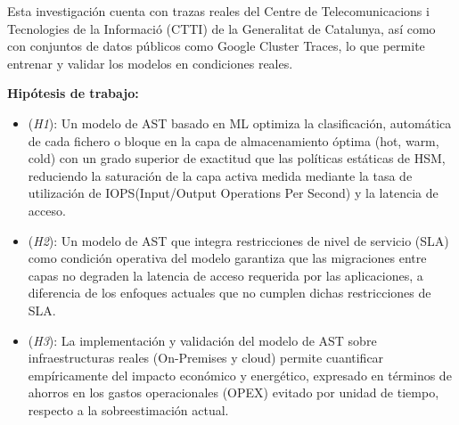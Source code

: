 Esta investigación cuenta con trazas reales del Centre de Telecomunicacions i Tecnologies de la Informació (CTTI) de la Generalitat de Catalunya, así como con conjuntos de datos públicos como Google Cluster Traces, lo que permite entrenar y validar los modelos en condiciones reales.


\medskip
\noindent\textbf{Hipótesis de trabajo:}

\begin{itemize}
    \item (\textit{H1}): Un modelo de AST basado en ML optimiza la clasificación, automática de cada fichero o bloque en la capa de almacenamiento óptima (hot, warm, cold) con un grado superior de exactitud que las políticas estáticas de HSM, reduciendo la saturación de la capa activa medida mediante la tasa de utilización de IOPS(Input/Output Operations Per Second) y la latencia de acceso.
    \item (\textit{H2}): Un modelo de AST que integra restricciones de nivel de servicio (SLA) como condición operativa del modelo garantiza que las migraciones entre capas no degraden la latencia de acceso requerida por las aplicaciones, a diferencia de los enfoques actuales que no cumplen dichas restricciones de SLA.
    \item (\textit{H3}): La implementación y validación del modelo de AST sobre infraestructuras reales (On-Premises y cloud) permite cuantificar empíricamente del impacto económico y energético, expresado en términos de ahorros en los gastos operacionales (OPEX) evitado por unidad de tiempo, respecto a la sobreestimación actual.
\end{itemize}

